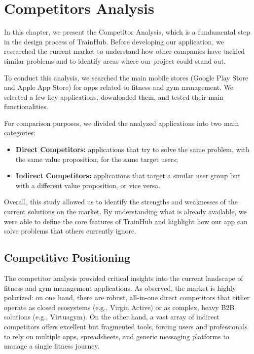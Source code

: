\section{Competitors Analysis}\label{sect:CompetitorsAnalysis}In this chapter, we present the Competitor Analysis, which is a fundamental step in the design process of TrainHub. Before developing our application, we researched the current market to understand how other companies have tackled similar problems and to identify areas where our project could stand out.

To conduct this analysis, we searched the main mobile stores (Google Play Store and Apple App Store) for apps related to fitness and gym management. We selected a few key applications, downloaded them, and tested their main functionalities.

For comparison purposes, we divided the analyzed applications into two main categories:
\begin{itemize}
    \item \textbf{Direct Competitors: }applications that try to solve the same problem, with the same value proposition, for the same target users;
    \item \textbf{Indirect Competitors: }applications that target a similar user group but with a different value proposition, or vice versa.
\end{itemize}

Overall, this study allowed us to identify the strengths and weaknesses of the current solutions on the market. By understanding what is already available, we were able to define the core features of TrainHub and highlight how our app can solve problems that others currently ignore.



\subsection{Competitive Positioning}\label{subsect:CompetitorsConclusion}
The competitor analysis provided critical insights into the current landscape of fitness and gym management applications. As observed, the market is highly polarized: on one hand, there are robust, all-in-one direct competitors that either operate as closed ecosystems (e.g., Virgin Active) or as complex, heavy B2B solutions (e.g., Virtuagym). On the other hand, a vast array of indirect competitors offers excellent but fragmented tools, forcing users and professionals to rely on multiple apps, spreadsheets, and generic messaging platforms to manage a single fitness journey.

